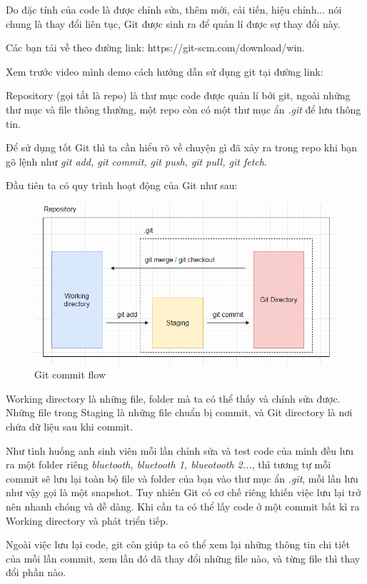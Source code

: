 Do đặc tính của code là được chỉnh sửa, thêm mới, cải tiến, hiệu chỉnh... nói chung là thay đổi liên tục, Git được sinh ra để quản lí được sự thay đổi này.

Các bạn tải về theo đường link: https://git-scm.com/download/win.

Xem trước video mình demo cách hướng dẫn sử dụng git tại đường link:

Repository (gọi tắt là repo) là thư mục code được quản lí bởi git, ngoài những thư mục và file thông thường, một repo còn có một thư mục ẩn \textit{.git} để lưu thông tin.

Để sử dụng tốt Git thì ta cần hiểu rõ về chuyện gì đã xảy ra trong repo khi bạn gõ lệnh như \textit{git add, git commit, git push, git pull, git fetch}.

Đầu tiên ta có quy trình hoạt động của Git như sau:

\begin{figure}[h!]
    \centering
    \includegraphics[width=1\linewidth]{images/gitCommitFlow.PNG}
    \caption{Git commit flow}
\end{figure}

Working directory là những file, folder mà ta có thể thấy và chỉnh sửa được. Những file trong Staging là những file chuẩn bị commit, và Git directory là nơi chứa dữ liệu sau khi commit.

Như tình huống anh sinh viên mỗi lần chỉnh sửa và test code của mình đều lưu ra một folder riêng \textit{bluetooth, bluetooth 1, blueotooth 2...}, thì tương tự mỗi commit sẽ lưu lại toàn bộ file và folder của bạn vào thư mục ẩn \textit{.git}, mỗi lần lưu như vậy gọi là một snapshot. Tuy nhiên Git có cơ chế riêng khiến việc lưu lại trở nên nhanh chóng và dễ dàng. Khi cần ta có thể lấy code ở một commit bất kì ra Working directory và phát triển tiếp.

Ngoài việc lưu lại code, git còn giúp ta có thể xem lại những thông tin chi tiết của mỗi lần commit, xem lần đó đã thay đổi những file nào, và từng file thì thay đổi phần nào.

